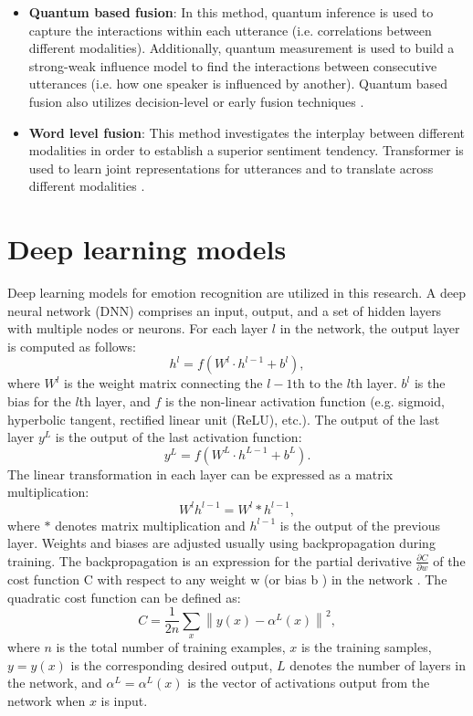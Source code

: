 \begin{itemize}
    \item \textbf{Quantum based fusion}: In this method, quantum inference is used to capture the interactions within each utterance (i.e. correlations between different modalities). Additionally, quantum measurement is used to build a strong-weak influence model to find the interactions between consecutive utterances (i.e. how one speaker is influenced by another). Quantum based fusion also utilizes decision-level or early fusion techniques \cite{MSA-review-3-9686504}. 
    \item \textbf{Word level fusion}: This method investigates the interplay between different modalities in order to establish a superior sentiment tendency. Transformer is used to learn joint representations for utterances and to translate across different modalities \cite{MSA_review2_GANDHI2023424}. 
\end{itemize}

\section{Deep learning models}
\label{sec:dl_models}
Deep learning models for emotion recognition are utilized in this research. A deep neural network (DNN) comprises an input, output, and a set of hidden layers with multiple nodes or neurons. For each layer $l$ in the network, the output layer is computed as follows:
%
\begin{equation*}
    h^{l} = f(W^{l} \cdot h^{l-1} + b^{l}),\tag{1}
\end{equation*}
%
where $W^{l}$ is the weight matrix connecting the $l-1$th to the $l$th layer. $b^{l}$ is the bias for the $l$th layer, and $f$ is the non-linear activation function (e.g. sigmoid, hyperbolic tangent, rectified linear unit (ReLU), etc.). The output of the last layer $y^{L}$ is the output of the last activation function:
%
\begin{equation*}
    y^{L} = f(W^{L} \cdot h^{L-1} + b^{L}). \tag{2}
\end{equation*}
%
The linear transformation in each layer can be expressed as a matrix multiplication:
%
\begin{equation*}
    W^lh^{l-1} = W^l {*} h^{l-1},\tag{3}
\end{equation*}
%
where $*$ denotes matrix multiplication and $h^{l-1}$ is the output of the previous layer. Weights and biases are adjusted usually using backpropagation during training. The backpropagation is an expression for the partial derivative $\frac{\partial C}{\partial w}$ of the cost function C with respect to any weight w (or bias b ) in the network \cite{cross_cultural}. The quadratic cost function can be defined as:
%
    \begin{equation*} C = \frac {1}{2n}\sum _{x}^{} \left \|{ y(x) - \alpha ^{L}(x) }\right \|^{2},\tag{4}\end{equation*}
%
where $n$ is the total number of training examples, $x$ is the training samples, $y=y(x)$ is the corresponding desired output, $L$ denotes the number of layers in the network, and $\alpha ^{L} = \alpha ^{L}(x)$ is the vector of activations output from the network when $x$ is input.

